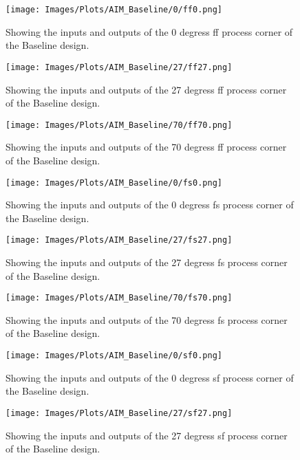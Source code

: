 \begin{figure}[htb] 
    \centering
    \texttt{[image: Images/Plots/AIM\_Baseline/0/ff0.png]} 
    \caption{Showing the inputs and outputs of the 0 degress ff process corner of the Baseline design.} 
    \label{fig:0ffBaseline} 
\end{figure}
\newline
\begin{figure}[htb] 
    \centering
    \texttt{[image: Images/Plots/AIM\_Baseline/27/ff27.png]} 
    \caption{Showing the inputs and outputs of the 27 degress ff process corner of the Baseline design.} 
    \label{fig:27ffBaseline} 
\end{figure}
\begin{figure}[htb] 
    \centering
    \texttt{[image: Images/Plots/AIM\_Baseline/70/ff70.png]} 
    \caption{Showing the inputs and outputs of the 70 degress ff process corner of the Baseline design.} 
    \label{fig:70ffBaseline} 
\end{figure}
\newline
\begin{figure}[htb] 
    \centering
    \texttt{[image: Images/Plots/AIM\_Baseline/0/fs0.png]} 
    \caption{Showing the inputs and outputs of the 0 degress fs process corner of the Baseline design.} 
    \label{fig:0fsBaseline} 
\end{figure}
\begin{figure}[htb] 
    \centering
    \texttt{[image: Images/Plots/AIM\_Baseline/27/fs27.png]} 
    \caption{Showing the inputs and outputs of the 27 degress fs process corner of the Baseline design.} 
    \label{fig:27fsBaseline} 
\end{figure}
\newline
\begin{figure}[htb] 
    \centering
    \texttt{[image: Images/Plots/AIM\_Baseline/70/fs70.png]} 
    \caption{Showing the inputs and outputs of the 70 degress fs process corner of the Baseline design.} 
    \label{fig:70fsBaseline} 
\end{figure}
\begin{figure}[htb] 
    \centering
    \texttt{[image: Images/Plots/AIM\_Baseline/0/sf0.png]} 
    \caption{Showing the inputs and outputs of the 0 degress sf process corner of the Baseline design.} 
    \label{fig:0sfBaseline} 
\end{figure}
\newline
\begin{figure}[htb] 
    \centering
    \texttt{[image: Images/Plots/AIM\_Baseline/27/sf27.png]} 
    \caption{Showing the inputs and outputs of the 27 degress sf process corner of the Baseline design.} 
    \label{fig:27sfBaseline} 
\end{figure}
